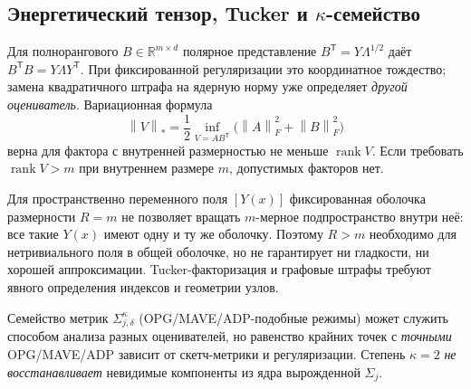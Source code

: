 \documentclass[10.5pt,a4paper]{article}
\newcommand{\R}{\mathbb{R}}
\newcommand{\T}{^{\mathsf T}}
\newcommand{\norm}[1]{\left\|#1\right\|}
\DeclareMathOperator{\rank}{rank}
\numberwithin{equation}{section}
\theoremstyle{plain}
\theoremstyle{definition}
\begin{document}
\subsection{Энергетический тензор, Tucker и $\kappa$-семейство}
Для полнорангового $B\in\R^{m\times d}$ полярное представление $B\T=Y\Lambda^{1/2}$ даёт $B\T B=Y\Lambda Y\T$. При фиксированной регуляризации это координатное тождество; замена квадратичного штрафа на ядерную норму уже определяет \emph{другой оцениватель}. Вариационная формула
\begin{equation}
 \norm{V}_*=\frac12\inf_{V=AB\T}\bigl(\norm{A}_F^2+\norm{B}_F^2\bigr)
 \label{eq:nuclear}
\end{equation}
верна для фактора с внутренней размерностью не меньше $\rank V$. Если требовать $\rank V>m$ при внутреннем размере $m$, допустимых факторов нет.

Для пространственно переменного поля $[Y(x)]$ фиксированная оболочка размерности $R=m$ не позволяет вращать $m$-мерное подпространство внутри неё: все такие $Y(x)$ имеют одну и ту же оболочку. Поэтому $R>m$ необходимо для нетривиального поля в общей оболочке, но не гарантирует ни гладкости, ни хорошей аппроксимации. Tucker-факторизация и графовые штрафы требуют явного определения индексов и геометрии узлов.

Семейство метрик $\Sigma_{j,\delta}^{\kappa}$ (OPG/MAVE/ADP-подобные режимы) может служить способом анализа разных оценивателей, но равенство крайних точек с \emph{точными} OPG/MAVE/ADP зависит от скетч-метрики и регуляризации. Степень $\kappa=2$ \emph{не восстанавливает} невидимые компоненты из ядра вырожденной $\Sigma_j$.
\end{document}
